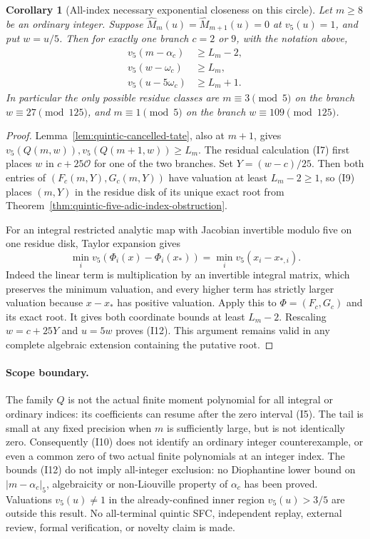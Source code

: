 \documentclass[11pt]{article}
\newtheorem{corollary}{Corollary}
\newcommand{\OO}{\mathcal O}
\begin{document}
\begin{corollary}[All-index necessary exponential closeness on this circle]\label{cor:quintic-integer-index-closeness}
Let $m\ge8$ be an ordinary integer.  Suppose
$\widehat M_m(u)=\widehat M_{m+1}(u)=0$ at $v_5(u)=1$,
and put $w=u/5$.  Then for exactly one branch $c=2$ or $9$,
with the notation above,
\[
 \begin{split}
 v_5(m-\alpha_c)&\ge L_m-2,\\
 v_5(w-\omega_c)&\ge L_m,\\
 v_5(u-5\omega_c)&\ge L_m+1 .
 \end{split}                                                       \tag{I12}
\]
In particular the only possible residue classes are
$m\equiv3\pmod5$ on the branch $w\equiv27\pmod{125}$,
and $m\equiv1\pmod5$ on the branch $w\equiv109\pmod{125}$.
\end{corollary}
\begin{proof}
Lemma~\ref{lem:quintic-cancelled-tate}, also at $m+1$, gives
$v_5(Q(m,w)),v_5(Q(m+1,w))\ge L_m$.
The residual calculation (I7) first places $w$ in
$c+25\OO$ for one of the two branches.
Set $Y=(w-c)/25$.
Then both entries of $(F_c(m,Y),G_c(m,Y))$ have
valuation at least $L_m-2\ge1$, so (I9) places $(m,Y)$
in the residue disk of its unique exact root from
Theorem~\ref{thm:quintic-five-adic-index-obstruction}.

For an integral restricted analytic map with Jacobian invertible
modulo five on one residue disk, Taylor expansion gives
\[
 \min_i v_5(\Phi_i(x)-\Phi_i(x_*))
       =\min_i v_5(x_i-x_{*,i}).
\]
Indeed the linear term is multiplication by an invertible
integral matrix, which preserves the minimum valuation, and
every higher term has strictly larger valuation because
$x-x_*$ has positive valuation.
Apply this to $\Phi=(F_c,G_c)$ and its exact root.
It gives both coordinate bounds at least $L_m-2$.
Rescaling $w=c+25Y$ and $u=5w$ proves (I12).
This argument remains valid in any complete algebraic extension
containing the putative root.
\end{proof}

\paragraph{Scope boundary.}
The family $Q$ is not the actual finite moment polynomial for
all integral or ordinary indices: its coefficients can resume
after the zero interval (I5).  The tail is small at any fixed
precision when $m$ is sufficiently large, but is not identically
zero.  Consequently (I10) does not identify an ordinary integer
counterexample, or even a common zero of two actual finite
polynomials at an integer index.
The bounds (I12) do not imply all-integer exclusion: no
Diophantine lower bound on $|m-\alpha_c|_5$, algebraicity or
non-Liouville property of $\alpha_c$ has been proved.
Valuations $v_5(u)\ne1$ in the already-confined inner region
$v_5(u)>3/5$ are outside this result.
No all-terminal quintic SFC, independent replay, external review,
formal verification, or novelty claim is made.
\end{document}
